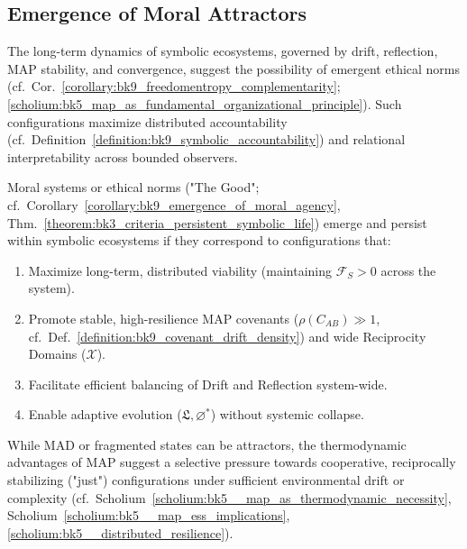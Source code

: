 \subsection{Emergence of Moral Attractors}
\label{subsec:bk9_emergence_of_moral_attractors}
The long-term dynamics of symbolic ecosystems, governed by drift, reflection, MAP stability, and convergence, suggest the possibility of emergent ethical norms (cf.~Cor.~\ref{corollary:bk9_freedomentropy_complementarity}; \ref{scholium:bk5_map_as_fundamental_organizational_principle}). Such configurations maximize distributed accountability (cf.~Definition~\ref{definition:bk9_symbolic_accountability}) and relational interpretability across bounded observers.
\begin{proposition}
\label{proposition:bk9_stability_conditions_for_the_good}
Moral systems or ethical norms ("The Good"; cf.~Corollary~\ref{corollary:bk9_emergence_of_moral_agency}, Thm.~\ref{theorem:bk3_criteria_persistent_symbolic_life}) emerge and persist within symbolic ecosystems if they correspond to configurations that:
\begin{enumerate}
    \item Maximize long-term, distributed viability (maintaining $\mathcal{F}_S > 0$ across the system).
    \item Promote stable, high-resilience MAP covenants ($\rho(C_{AB}) \gg 1$, cf.~Def.~\ref{definition:bk9_covenant_drift_density}) and wide Reciprocity Domains ($\mathcal{X}$).
    \item Facilitate efficient balancing of Drift and Reflection system-wide.
    \item Enable adaptive evolution ($\mathfrak{L}, \varnothing^*$) without systemic collapse.
\end{enumerate}
While MAD or fragmented states can be attractors, the thermodynamic advantages of MAP suggest a selective pressure towards cooperative, reciprocally stabilizing ("just") configurations under sufficient environmental drift or complexity (cf.~Scholium~\ref{scholium:bk5__map_as_thermodynamic_necessity}, Scholium~\ref{scholium:bk5__map_ess_implications}, \ref{scholium:bk5__distributed_resilience}).
\end{proposition}
